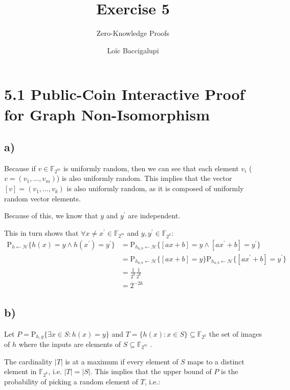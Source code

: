 \documentclass{scrartcl}
\title{Exercise 5}
\subtitle{Zero-Knowledge Proofs}
\author{Loïc Baccigalupi}
\begin{document}
\maketitle

\section*{5.1 Public-Coin Interactive Proof for Graph Non-Isomorphism}

\subsection{a)}

Because if $v \in \mathbb{F}_{2^m}$ is uniformly random, then we can see that each element $v_i$ ($v = (v_1, \dots, v_m)$) is also uniformly random. 
This implies that the vector $[v] = (v_1, \dots, v_k)$ is also uniformly random, as it is composed of uniformly random vector elements.

Because of this, we know that $y$ and $y^{\prime}$ are independent.

This in turn shows that $\forall x \neq x^{\prime} \in \mathbb{F}_{2^m}$ and $y,y^{\prime} \in \mathbb{F}_{2^k}$:
\begin{equation*}
    \begin{split}
        \text{P}_{h \leftarrow \mathcal{H}}\{h(x)=y \wedge h(x^{\prime}) = y^{\prime} \}
            &= \text{P}_{h_{a,b} \leftarrow \mathcal{H}}\{[ax+b]=y \wedge [ax^{\prime} + b] = y^{\prime} \} \\
            &= \text{P}_{h_{a,b} \leftarrow \mathcal{H}}\{[ax+b]=y \}\text{P}_{h_{a,b} \leftarrow \mathcal{H}}\{[ax^{\prime} + b] = y^{\prime} \} \\
            &= \frac{1}{2^k}\frac{1}{2^k} \\
            &= 2^{-2k}
    \end{split}
\end{equation*}


\subsection{b)}

Let $P = \text{P}_{h, y}\{\exists x \in S : h(x) = y \} $ and $T = \{h(x) : x \in S \} \subseteq \mathbb{F}_{2^k}$ the set of images of $h$ where the inputs are elements of $S \subseteq \mathbb{F}_{2^m}$ .

The cardinality $|T|$ is at a maximum if every element of $S$ maps to a distinct element in $\mathbb{F}_{2^k}$, i.e. $|T|=|S|$.
This implies that the upper bound of $P$ is the probability of picking a random element of $T$, i.e.:
\end{document}
